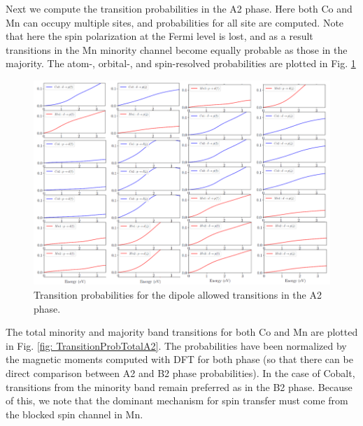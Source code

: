 Next we compute the transition probabilities in the A2 phase. Here both Co and Mn can occupy multiple sites, and probabilities for all site are computed. Note that here the spin polarization at the Fermi level is lost, and as a result transitions in the Mn minority channel become equally probable as those in the majority. The atom-, orbital-, and spin-resolved probabilities are plotted in Fig. \ref{fig: TransitionProbA2}
\begin{figure}[htbp]
	\begin{center}
		\includegraphics[width=150mm]{figs/TransitionProbA2}
	\end{center}
	\caption{Transition probabilities for the dipole allowed transitions in the A2 phase.}
	\label{fig: TransitionProbA2}
\end{figure}
The total minority and majority band transitions for both Co and Mn are plotted in Fig. \ref{fig: TransitionProbTotalA2}. The probabilities have been normalized by the magnetic moments computed with DFT for both phase (so that there can be direct comparison between A2 and B2 phase probabilities). In the case of Cobalt, transitions from the minority band remain preferred as in the B2 phase. Because of this, we note that the dominant mechanism for spin transfer must come from the blocked spin channel in Mn.
